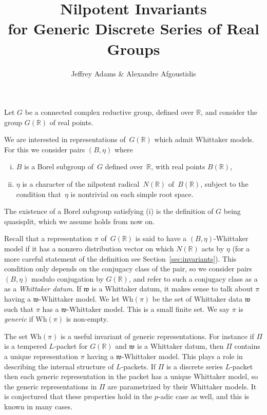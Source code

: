 \documentclass[10pt,leqno]{article}
\numberwithin{equation}{section}
\newcommand{\R}{\mathbb R}
\newcommand{\w}{\mathfrak w}
\newcommand{\Wh}{\mathrm{Wh}}
\begin{document}
\title{Nilpotent Invariants \\ for Generic Discrete Series of Real Groups}
\author{Jeffrey Adams \& Alexandre Afgoustidis}
\maketitle

Let $G$ be a connected complex reductive group, defined over $\R$, and consider the group $G(\R)$ of real points. 

We are interested in representations of~$G(\R)$ which admit Whittaker models. For this we consider pairs $(B,\eta)$ where 
\begin{enumerate}[(i)]
\item $B$ is a Borel subgroup of~$G$ defined over~$\R$, with real points $B(\R)$,
\item $\eta$ is a character of the nilpotent radical~$N(\R)$ of~$B(\R)$, subject to the condition that~$\eta$ is nontrivial on each simple root space.
\end{enumerate}
The existence of a Borel subgroup satisfying (i) is the definition of $G$ being quasisplit, which we assume holds from now on.

Recall that a representation $\pi$ of~$G(\R)$ is said to {have a $(B,\eta)$-Whittaker model} if it has a nonzero distribution vector on which $N(\R)$ acts by $\eta$ (for a more careful statement of the definition see Section~\ref{sec:invariants}).
This condition only depends on the conjugacy class of the pair, 
so we  consider pairs $(B,\eta)$ modulo conjugation by $G(\R)$, and refer to such a conjugacy class as a 
as a {\it Whittaker datum}.
If $\w$ is a Whittaker datum, it makes sense to talk about $\pi$ having a $\w$-Whittaker model. We let $\Wh(\pi)$  be the set of
Whittaker data $\w$ such that $\pi$ has a $\w$-Whittaker model. This is a small finite set.
We say $\pi$ is {\it generic} if $\Wh(\pi)$ is non-empty.

The set $\Wh(\pi)$ is
a useful invariant of generic representations.
For instance if $\Pi$ is a tempered $L$-packet for $G(\R)$ and $\w$ is a Whittaker datum, then $\Pi$ contains a unique representation $\pi$
having a $\w$-Whittaker model. This plays a role in describing the internal structure of $L$-packets.
If $\Pi$ is a discrete series $L$-packet then each generic representation in the packet has a unique
Whittaker model, so the generic representations in $\Pi$ are parametrized by their Whittaker models.
It is conjectured that these properties hold in the $p$-adic case as well, and this is known in many cases.
\end{document}
